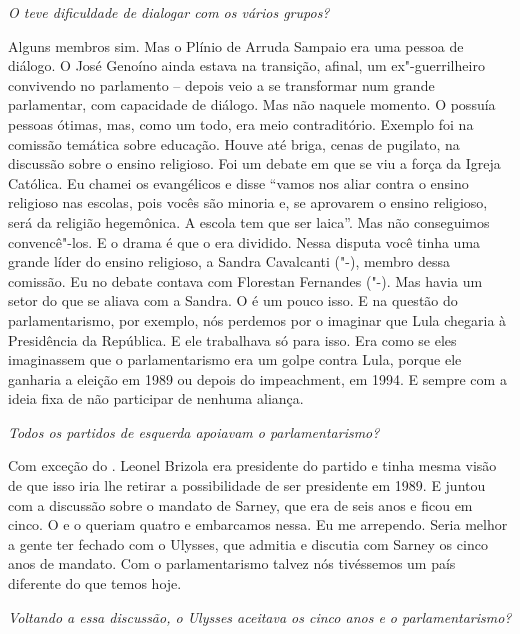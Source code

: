 \medskip

\noindent\emph{O  teve dificuldade de dialogar com os vários grupos?}

Alguns membros sim. Mas o Plínio de Arruda Sampaio era
uma pessoa de diálogo. O José Genoíno ainda estava na transição, afinal,
um ex"-guerrilheiro convivendo no parlamento -- depois veio a se
transformar num grande parlamentar, com capacidade de diálogo. Mas não
naquele momento. O  possuía pessoas ótimas, mas, como um todo, era
meio contraditório. Exemplo foi na comissão temática sobre educação.
Houve até briga, cenas de pugilato, na discussão sobre o ensino
religioso. Foi um debate em que se viu a força da Igreja Católica. Eu
chamei os evangélicos e disse ``vamos nos aliar contra o ensino
religioso nas escolas, pois vocês são minoria e, se aprovarem o ensino
religioso, será da religião hegemônica. A escola tem que ser laica''.
Mas não conseguimos convencê"-los. E o drama é que o  era dividido.
Nessa disputa você tinha uma grande líder do ensino religioso, a Sandra
Cavalcanti ("-), membro dessa comissão. Eu no debate contava com
Florestan Fernandes ("-). Mas havia um setor do  que se aliava com
a Sandra. O  é um pouco isso. E na questão do parlamentarismo, por
exemplo, nós perdemos por o  imaginar que Lula chegaria à Presidência
da República. E ele trabalhava só para isso. Era como se eles
imaginassem que o parlamentarismo era um golpe contra Lula, porque ele
ganharia a eleição em 1989 ou depois do impeachment, em 1994. E sempre
com a ideia fixa de não participar de nenhuma aliança.

\medskip

\noindent\emph{Todos os partidos de esquerda apoiavam o parlamentarismo?}

Com exceção do . Leonel Brizola era presidente do
partido e tinha mesma visão de que isso iria lhe retirar a possibilidade
de ser presidente em 1989. E juntou com a discussão sobre o mandato de
Sarney, que era de seis anos e ficou em cinco. O  e o  queriam
quatro e embarcamos nessa. Eu me arrependo. Seria melhor a gente ter
fechado com o Ulysses, que admitia e discutia com Sarney os cinco anos
de mandato. Com o parlamentarismo talvez nós tivéssemos um país
diferente do que temos hoje.

\medskip

\noindent\emph{Voltando a essa discussão, o Ulysses aceitava os cinco anos e o
parlamentarismo?}

